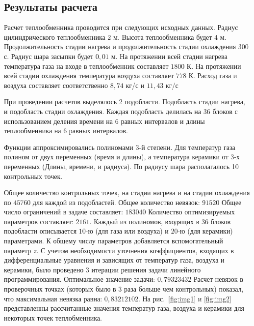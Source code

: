 \documentclass[a4paper,11pt,numreferences,mathsec,kaplist]{isuepsutf8}
\begin{document}
\begin{article}
\section{Результаты расчета}

Расчет теплообменника проводится при следующих исходных данных. Радиус
цилиндрического теплообменника $2$ м. Высота теплообменника будет $4$ м.
Продолжительность стадии нагрева и продолжительность стадии охлаждения
$300$ с. Радиус шара засыпки будет $0,01$ м. На протяжении всей стадии
нагрева температура газа на входе в теплообменник составляет $1800$ К.
На протяжении всей стадии охлаждения температура воздуха составляет
$778$ К. Расход газа и воздуха составляет соответственно $8,74$ кг/с и
$11,43$ кг/с

При проведении расчетов выделялось 2 подобласти. Подобласть стадии
нагрева, и подобласть стадии охлаждения. Каждая подобласть делилась на
36 блоков с использованием деления времени на 6 равных интервалов и
длины теплообменника на 6 равных интервалов.

Функции аппроксимировались полиномами 3-й степени. Для температур газа
полином от двух переменных (время и длины), а температура керамики от
3-х переменных (Длины, времени, и радиуса). По радиусу шара
располагалось 10 контрольных точек.

Общее количество контрольных точек, на стадии нагрева и на стадии
охлаждения по $45760$ для каждой из подобластей. Общее количество
невязок: $91520$ Общее число ограничений в задаче составляет:
$183040$
Количество оптимизируемых параметров составляет: $2161$. Каждый из
полиномов, входящих в $36$ блоков подобласти описывается $10$-ю (для газа
или воздуха) и $20$-ю (для керамики) параметрами. К общему числу
параметров добавляется вспомогательный параметр $z$. С учетом
необходимости уточнения коэффициентов, входящих в дифференциальные
уравнения и зависящих от температур газа, воздуха и керамики, было
проведено $3$ итерации решения задачи линейного программирования.
Оптимальное значение задачи: $0,79323432$ Расчет невязок в проверочных
точках (которых было в $3$ раза больше чем контрольных) показал, что
максимальная невязка равна: $0,83212102$. На рис.~\ref{fig:img1} и 
\ref{fig:img2} представленны рассчитанные значения температур газа,
воздуха и керамики для некоторых точек теплобменника.


\end{article}
\end{document}
